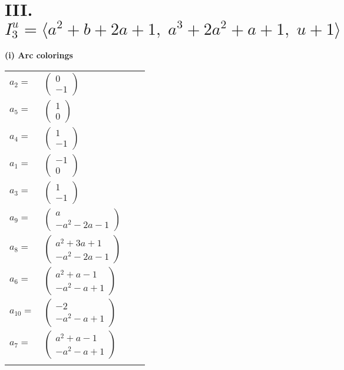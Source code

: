 \documentclass[1p]{elsarticle_modified}
\theoremstyle{definition}
\begin{document}
\centering \section*{III. $I^u_{3}= \langle a^2+b+2 a+1,\;a^3+2 a^2+a+1,\;u+1 \rangle$}
\flushleft \textbf{(i) Arc colorings}\\
\begin{tabular}{m{7pt} m{180pt} m{7pt} m{180pt} }
\flushright $a_{2}=$&$\begin{pmatrix}0\\-1\end{pmatrix}$ \\
\flushright $a_{5}=$&$\begin{pmatrix}1\\0\end{pmatrix}$ \\
\flushright $a_{4}=$&$\begin{pmatrix}1\\-1\end{pmatrix}$ \\
\flushright $a_{1}=$&$\begin{pmatrix}-1\\0\end{pmatrix}$ \\
\flushright $a_{3}=$&$\begin{pmatrix}1\\-1\end{pmatrix}$ \\
\flushright $a_{9}=$&$\begin{pmatrix}a\\- a^2-2 a-1\end{pmatrix}$ \\
\flushright $a_{8}=$&$\begin{pmatrix}a^2+3 a+1\\- a^2-2 a-1\end{pmatrix}$ \\
\flushright $a_{6}=$&$\begin{pmatrix}a^2+a-1\\- a^2- a+1\end{pmatrix}$ \\
\flushright $a_{10}=$&$\begin{pmatrix}-2\\- a^2- a+1\end{pmatrix}$ \\
\flushright $a_{7}=$&$\begin{pmatrix}a^2+a-1\\- a^2- a+1\end{pmatrix}$\\&\end{tabular}
\end{document}
